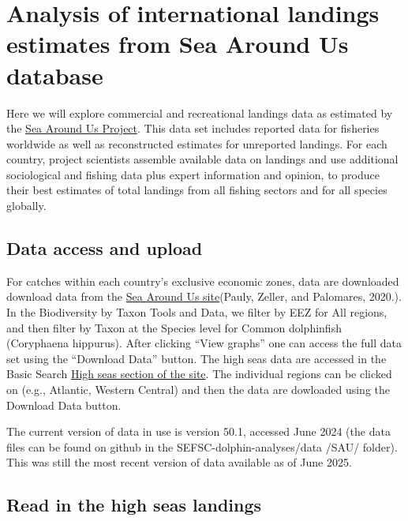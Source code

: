 \documentclass[
]{article}
\begin{document}


\section{Analysis of international landings estimates from Sea Around Us
database}\label{analysis-of-international-landings-estimates-from-sea-around-us-database}

Here we will explore commercial and recreational landings data as
estimated by the \href{https://www.seaaroundus.org/data/\#/eez}{Sea
Around Us Project}. This data set includes reported data for fisheries
worldwide as well as reconstructed estimates for unreported landings.
For each country, project scientists assemble available data on landings
and use additional sociological and fishing data plus expert information
and opinion, to produce their best estimates of total landings from all
fishing sectors and for all species globally.

\subsection{Data access and upload}\label{data-access-and-upload}

For catches within each country's exclusive economic zones, data are
downloaded download data from the
\href{https://www.seaaroundus.org/data/\#/topic/biodiversity}{Sea Around
Us site}(Pauly, Zeller, and Palomares, 2020.). In the Biodiversity by
Taxon Tools and Data, we filter by EEZ for All regions, and then filter
by Taxon at the Species level for Common dolphinfish (Coryphaena
hippurus). After clicking ``View graphs'' one can access the full data
set using the ``Download Data'' button. The high seas data are accessed
in the Basic Search
\href{https://www.seaaroundus.org/data/\#/highseas}{High seas section of
the site}. The individual regions can be clicked on (e.g., Atlantic,
Western Central) and then the data are dowloaded using the Download Data
button.

The current version of data in use is version 50.1, accessed June 2024
(the data files can be found on github in the
SEFSC-dolphin-analyses/data /SAU/ folder). This was still the most
recent version of data available as of June 2025.

\subsection{Read in the high seas
landings}\label{read-in-the-high-seas-landings}
\end{document}

